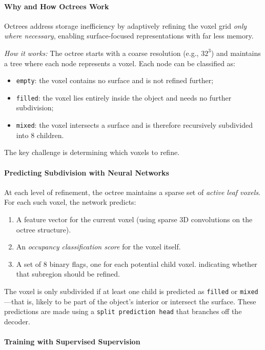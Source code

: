 \paragraph{Why and How Octrees Work}

Octrees address storage inefficiency by adaptively refining the voxel grid \emph{only where necessary}, enabling surface-focused representations with far less memory.

\emph{How it works:} The octree starts with a coarse resolution (e.g., \(32^3\)) and maintains a tree where each node represents a voxel. Each node can be classified as:
\begin{itemize}
    \item \texttt{empty}: the voxel contains no surface and is not refined further;
    \item \texttt{filled}: the voxel lies entirely inside the object and needs no further subdivision;
    \item \texttt{mixed}: the voxel intersects a surface and is therefore recursively subdivided into 8 children.
\end{itemize}

The key challenge is determining which voxels to refine.

\paragraph{Predicting Subdivision with Neural Networks}

At each level of refinement, the octree maintains a sparse set of \emph{active leaf voxels}. For each such voxel, the network predicts:
\begin{enumerate}
    \item A feature vector for the current voxel (using sparse 3D convolutions on the octree structure).
    \item An \emph{occupancy classification score} for the voxel itself.
    \item A set of 8 binary flags, one for each potential child voxel. indicating whether that subregion should be refined.
\end{enumerate}

The voxel is only subdivided if at least one child is predicted as \texttt{filled} or \texttt{mixed}—that is, likely to be part of the object’s interior or intersect the surface. These predictions are made using a \texttt{split prediction head} that branches off the decoder.

\paragraph{Training with Supervised Supervision}

